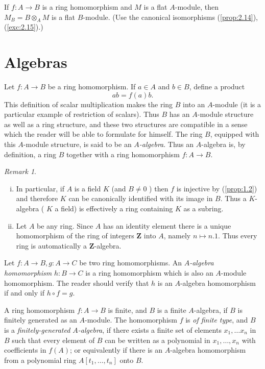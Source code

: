\documentclass{standalone}
\theoremstyle{definition}
\theoremstyle{remark}
\newtheorem*{remark}{Remark}
\begin{document}
\begin{exercise}
If $f\colon A \to B$ is a ring homomorphism and $M$ is a flat
$A$-module, then $M_{B}=B \otimes_{A} M$ is a flat $B$-module. (Use the
canonical isomorphisms (\ref{prop:2.14}), (\ref{exc:2.15}).)
\end{exercise}
\section{Algebras}
Let $f\colon A \to B$ be a ring homomorphism. If $a \in A$ and $b \in B$, define a
product
\[
  a b=f(a) b .
\]
This definition of scalar multiplication makes the ring $B$ into an $A$-module
(it is a particular example of restriction of scalars). Thus $B$ has an
$A$-module structure as well as a ring structure, and these two structures are
compatible in a sense which the reader will be able to formulate for himself.
The ring $B$, equipped with this $A$-module structure, is said to be an
{\itshape $A$-algebra}. Thus an $A$-algebra is, by definition, a ring
$B$ together with a ring homomorphism $f\colon A \to B$.
\begin{remark}
\begin{enumerate}[i)]
\item In particular, if $A$ is a field $K$ (and $B \neq 0$ ) then $f$ is
injective by (\ref{prop:1.2}) and therefore $K$ can be canonically identified with its
image in $B$. Thus a $K$-algebra ( $K$ a field) is effectively a ring containing
$K$ as a subring.
  \item  Let $A$ be any ring. Since $A$ has an identity element there is a unique
homomorphism of the ring of integers $\mathbf{Z}$ into $A$, namely
$n \mapsto n .1$. Thus every ring is automatically a $\mathbf{Z}$-algebra.
\end{enumerate}
\end{remark}
Let $f\colon A \to B, g\colon A \to C$ be two ring homomorphisms. An
{\itshape $A$-algebra
homomorphism} $h\colon B \to C$ is a ring homomorphism which is also an $A$-module
homomorphism. The reader should verify that $h$ is an $A$-algebra homomorphism
if and only if $h \circ f=g$.

A ring homomorphism $f\colon A \to B$ is finite, and $B$ is a finite $A$-algebra, if
$B$ is finitely generated as an $A$-module. The homomorphism $f$ is
{\itshape of finite type}, and $B$ is a {\itshape finitely-generated
  $A$-algebra}, if there exists a finite set of elements $x_{1},
\ldots x_{n}$ in $B$ such that every element of $B$ can be 
written as a polynomial in $x_{1}, \ldots, x_{n}$ with coefficients in $f(A)$;
or equivalently if there is an $A$-algebra homomorphism from a polynomial ring
$A\left[t_{1}, \ldots, t_{n}\right]$ onto $B$.
\end{document}
